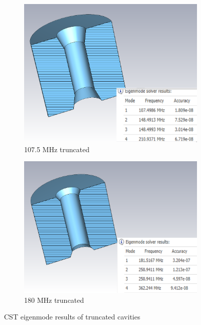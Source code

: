 \documentclass[a4paper,oneside,12pt]{report}
\numberwithin{equation}{chapter}
\begin{document}
\begin{figure}[H]
    \centering
    \begin{subfigure}{.5\textwidth}
      \centering
      \includegraphics[width=.9\linewidth]{./figures/cst/cst107mod.png}
      \caption{107.5 MHz truncated}
    \end{subfigure}%
    \begin{subfigure}{.5\textwidth}
      \centering
      \includegraphics[width=.9\linewidth]{./figures/cst/cst180mod.png}
      \caption{180 MHz truncated}
    \end{subfigure}
    \caption{CST eigenmode results of truncated cavities}
    \label{fig:107_180_modified_cavities_cst_eigenmode}
\end{figure}
\end{document}

